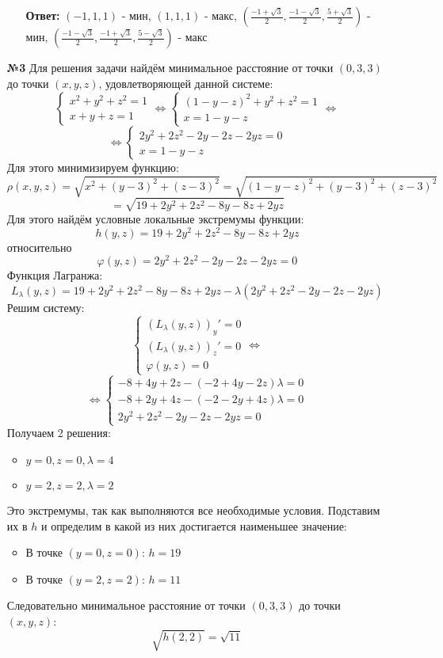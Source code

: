 \documentclass[a4paper]{article}
\newcommand{\case}[1]{\begin{cases} #1 \end{cases}}
\renewcommand{\phi}{\varphi}
\newcommand{\lr}{\Leftrightarrow}
\begin{document}
\begin{enumerate}
\begin{enumerate}
        \textbf{Ответ: } $(-1, 1, 1)$ - мин, $(1, 1, 1)$ - макс, 
        $(\frac{-1 + \sqrt{3}}{2}, \frac{-1 - \sqrt{3}}{2}, \frac{5 + \sqrt{3}}{2})$ - мин,
         $(\frac{-1 - \sqrt{3}}{2}, \frac{-1 + \sqrt{3}}{2}, \frac{5 -\sqrt{3}}{2}) $ - макс\\
    \end{enumerate}

    \item[\textbf{№3}]
    Для решения задачи найдём минимальное расстояние от точки $(0, 3, 3)$ до точки $(x, y, z)$,
    удовлетворяющей данной системе:
    $$\case{
        x^2 + y^2 + z^2 = 1\\
        x+y+z = 1
    } \lr \case{
        (1-y-z)^2+y^2+z^2=1 \\
        x = 1-y-z
    }\lr$$
    $$\lr \case{
        2y^2+2z^2-2y-2z-2yz = 0\\
        x =1-y-z
    }$$
    Для этого минимизируем функцию:
    $$\rho(x, y, z) = \sqrt{x^2+(y-3)^2+(z-3)^2 }= \sqrt{(1-y-z)^2+(y-3)^2+(z-3)^2 }$$
    $$ = \sqrt{19+2y^2+2z^2-8y-8z+2yz}$$
    Для этого найдём условные локальные экстремумы функции:
    $$h(y, z) = 19+2y^2+2z^2-8y-8z+2yz$$
    относительно
    $$\phi(y, z) =2y^2+2z^2-2y-2z-2yz = 0 $$
    Функция Лагранжа:
    $$L_\lambda(y, z) =19+2y^2+2z^2-8y-8z+2yz -\lambda(2y^2+2z^2-2y-2z-2yz)$$
    Решим систему:
    $$\case{
        (L_\lambda(y, z))_y' =0\\
        (L_\lambda(y, z))_z' = 0\\
        \phi(y, z) = 0
    } \lr$$
    $$\lr \case{
        -8 + 4y + 2z - (-2 + 4y - 2z)\lambda = 0\\
        -8 + 2y + 4z - (-2 - 2y + 4z)\lambda = 0\\
        2y^2+2z^2-2y-2z-2yz = 0
    }$$
    Получаем 2 решения:
    \begin{itemize}
        \item  \( y = 0, z = 0, \lambda = 4 \)
        \item  \( y = 2, z = 2, \lambda = 2 \)
    \end{itemize}
    Это экстремумы, так как выполняются все необходимые условия. Подставим их в $h$ и определим в какой из них достигается наименьшее значение:
    \begin{itemize}
        \item В точке \( (y = 0, z = 0) \): \( h = 19 \)
        \item В точке \( (y = 2, z = 2) \): \( h = 11 \)
    \end{itemize}
    Следовательно минимальное расстояние от точки $(0, 3, 3)$ до точки $(x, y, z)$:
    $$\sqrt{h(2, 2)} = \sqrt{11}$$


\end{enumerate}
\end{document}
